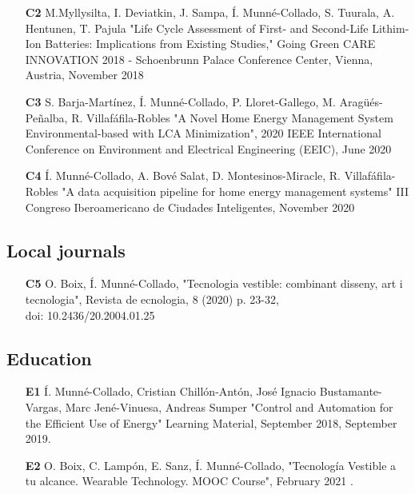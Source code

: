 \begin{itemize}
	\item [\textbf{C2}] M.Myllysilta, I. Deviatkin, J. Sampa,  \'{I}. Munn\'{e}-Collado, S. Tuurala, A. Hentunen, T. Pajula  "Life Cycle Assessment of First- and Second-Life Lithim-Ion Batteries: Implications from Existing Studies," Going Green CARE INNOVATION 2018 - Schoenbrunn Palace Conference Center, Vienna, Austria, November 2018
	\item [\textbf{C3}] S. Barja-Mart\'{i}nez, \'{I}. Munn\'{e}-Collado, P. Lloret-Gallego, M. Arag\"{u}\'{e}s-Pe\~{n}alba, R. Villaf\'{a}fila-Robles "A Novel Home Energy Management System Environmental-based with LCA Minimization", 2020 IEEE International Conference on Environment and Electrical Engineering (EEIC), June 2020
	\item [\textbf{C4}] \'{I}. Munn\'{e}-Collado, A. Bov\'{e} Salat, D. Montesinos-Miracle, R. Villaf\'{a}fila-Robles "A data acquisition pipeline for home energy management systems" III Congreso Iberoamericano de Ciudades Inteligentes, November 2020

\end{itemize}

\subsection*{Local journals}
\begin{itemize}
	\item [\textbf{C5}] O. Boix, \'{I}. Munn\'{e}-Collado, "Tecnologia vestible: combinant disseny, art i tecnologia", Revista de ecnologia, 8 (2020) p. 23-32,  \\doi: 10.2436/20.2004.01.25
\end{itemize}

\subsection*{Education}

\begin{itemize}
	\item [\textbf{E1}] \'{I}. Munn\'{e}-Collado, Cristian Chill\'{o}n-Ant\'{o}n, Jos\'{e} Ignacio Bustamante-Vargas, Marc Jen\'{e}-Vinuesa, Andreas Sumper "Control and Automation for the Efficient Use of Energy" Learning Material, September 2018, September 2019.	
	\item [\textbf{E2}] O. Boix, C. Lamp\'{o}n, E. Sanz, \'{I}. Munn\'{e}-Collado, "Tecnolog\'{i}a Vestible a tu alcance. Wearable Technology. MOOC Course", February 2021	.
\end{itemize}


